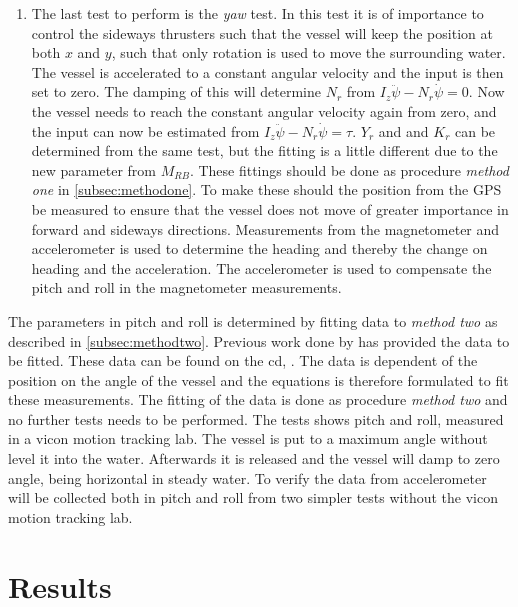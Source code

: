 \begin{enumerate}
	\item The last test to perform is the \textit{yaw} test. In this test it is of importance to control the sideways thrusters such that the vessel will keep the position at both $x$ and $y$, such that only rotation is used to move the surrounding water. The vessel is accelerated to a constant angular velocity and the input is then set to zero. The damping of this will determine $N_r$ from $I_z\ddot \psi - N_r \dot \psi = 0$. Now the vessel needs to reach the constant angular velocity again from zero, and the input can now be estimated from $I_z\ddot \psi - N_r \dot \psi = \tau$. $Y_r$ and and $K_r$ can be determined from the same test, but the fitting is a little different due to the new parameter from $M_{RB}$. These fittings should be done as procedure \textit{method one} in \ref{subsec:methodone}. To make these should the position from the \ac{GPS} be measured to ensure that the vessel does not move of greater importance in forward and sideways directions. Measurements from the magnetometer and accelerometer is used to determine the heading and thereby the change on heading and the acceleration. The accelerometer is used to compensate the pitch and roll in the magnetometer measurements.
\end{enumerate}
The parameters in pitch and roll is determined by fitting data to \textit{method two} as described in \ref{subsec:methodtwo}. Previous work done by \citep{13gr931} has provided the data to be fitted. These data can be found on the cd, . The data is dependent of the position on the angle of the vessel and the equations is therefore formulated to fit these measurements. The fitting of the data is done as procedure \textit{method two} and no further tests needs to be performed. The tests shows pitch and roll, measured in a vicon motion tracking lab. The vessel is put to a maximum angle without level it into the water. Afterwards it is released and the vessel will damp to zero angle, being horizontal in steady water. To verify the data from \citep{13gr931} accelerometer will be collected both in pitch and roll from two simpler tests without the vicon motion tracking lab.

\section{Results}
